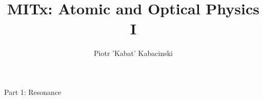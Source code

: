 
\title{\Huge MITx: Atomic and Optical Physics I}
\author{Piotr 'Kabat' Kabacinski}
\date{}



\maketitle

\begin{center}\Huge Part 1: Resonance\end{center}



\newpage



\newpage



\newpage

